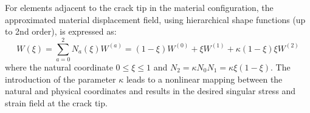 \documentclass[review]{elsarticle}
\numberwithin{equation}{section}
\begin{document}


For elements adjacent to the crack tip in the material configuration, the approximated material displacement field, using hierarchical shape functions (up to 2nd order), is expressed as:
\begin{equation}\label{eq:hierarchical_u}
W(\xi) = \sum_{a=0}^2 N_a (\xi) W^{(a)} = (1 -\xi)W^{(0)} + \xi W^{(1)} + \kappa (1 - \xi) \xi W^{(2)}
\end{equation}
where the natural coordinate $0\le \xi \le 1$ and $N_2 = \kappa N_0 N_1 =  \kappa\xi(1 - \xi)$. The introduction of the parameter $\kappa$ leads to a nonlinear mapping between the natural and physical coordinates and results in the desired singular stress and strain field at the crack tip. 
\end{document}
